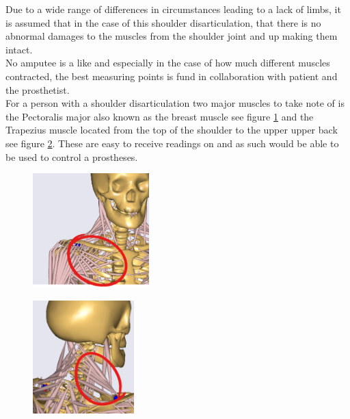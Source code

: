 Due to a wide range of differences in circumstances leading to a lack of limbs, it is assumed that in the case of this shoulder disarticulation, that there is no abnormal damages to the muscles from the shoulder joint and up making them intact.\\
No amputee is a like and especially in the case of how much different muscles contracted, 
the best measuring points is fund in collaboration with patient and the prosthetist.\\ 
For a person with a shoulder disarticulation two major muscles to take note of is the Pectoralis major also known as the breast muscle see figure \ref{fig:Pectoralis major} and the Trapezius muscle located from the top of the shoulder to the upper upper back see figure \ref{fig:Trapezius}. These are easy to receive readings on and as such would be able to be used to control a prostheses.\\ 
\begin{multicols}{2}
\begin{figure}[H]
    \centering 
    \includegraphics[width=0.4\textwidth]{Figures/Contextual_figures/ProsthesesPics/musclepec1.png}
    \caption{}
    \label{fig:Pectoralis major}
\end{figure}
\columnbreak
\begin{figure}[H]
    \centering
    \includegraphics[width=0.35\textwidth]{Figures/Contextual_figures/ProsthesesPics/muscletrap1.png}
    \caption{}
    \label{fig:Trapezius}
\end{figure}
\end{multicols}